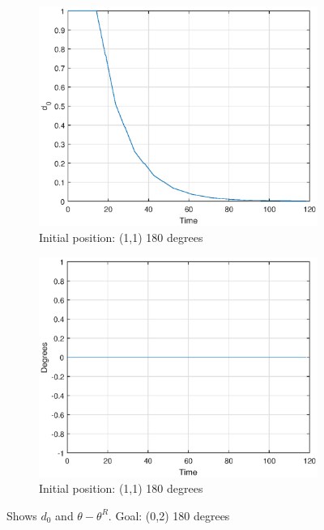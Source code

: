 \begin{figure}[H]
   
    \begin{subfigure}[b]{6cm}
        \includegraphics[width=\textwidth]{task_9_500_d0_initial_11180_Goal_02180.eps}
        \caption{Initial position: (1,1) 180 degrees}
        \label{fig:d01118002180}
    \end{subfigure}
     \begin{subfigure}[b]{6cm}
        \includegraphics[width=\textwidth]{task_9_500_deg_initial_11180_Goal_02180.eps}
        \caption{Initial position: (1,1) 180 degrees}
        \label{fig:deg1118002180}
    \end{subfigure}
    \caption{Shows $d_0$ and $\theta-\theta^R$. Goal: (0,2) 180 degrees}
\end{figure}

